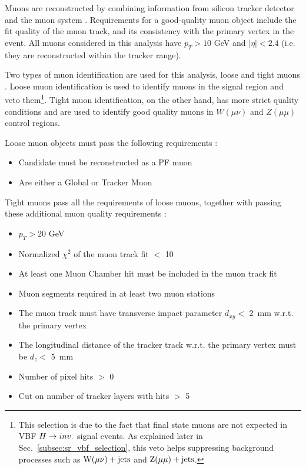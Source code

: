 Muons are reconstructed by combining information from silicon tracker detector and the muon system
\cite{cms:muon_paper}. Requirements for a good-quality muon object include the fit quality of the
muon track, and its consistency with the primary vertex in the event. All muons considered in this
analysis have $p_T > 10$ GeV and $|\eta| < 2.4$ (i.e. they are reconstructed within the tracker range).

Two types of muon identification are used for this analysis, loose and tight muons \cite{CMS-MUO-TWIKI-IDLOOSE,CMS-MUO-TWIKI-IDTIGHT}.
Loose muon identification is used to identify muons in the signal region and veto them\footnote{This selection is due to the fact that
final state muons are not expected in VBF $H \rightarrow inv.$ signal events. As explained later in Sec.~\ref{subsec:sr_vbf_selection}, this veto
helps suppressing background processes such as $\mathrm{W}(\mu\nu)+\textrm{jets}$ and $\mathrm{Z}(\mu\mu)+\textrm{jets}$.}. 
Tight muon identification, on the other hand,
has more strict quality conditions and are used to identify good quality muons in $W(\mu \nu)$ and $Z(\mu \mu)$ control regions.

Loose muon objects must pass the following requirements \cite{CMS-MUO-TWIKI-IDLOOSE}:

\begin{itemize}
    \item Candidate must be reconstructed as a PF muon
    \item Are either a Global or Tracker Muon
\end{itemize}

Tight muons pass all the requirements of loose muons, together with passing these additional muon quality requirements \cite{CMS-MUO-TWIKI-IDTIGHT}:

\begin{itemize}
    \item $p_T > 20$ GeV
    \item Normalized $\chi^2$ of the muon track fit $<$ 10
    \item At least one Muon Chamber hit must be included in the muon track fit
    \item Muon segments required in at least two muon stations
    \item The muon track must have transverse impact parameter $d_{xy} < $ 2~mm w.r.t. the primary vertex
    \item The longitudinal distance of the tracker track w.r.t. the primary vertex must be $d_z < $ 5~mm
    \item Number of pixel hits $>$ 0
    \item Cut on number of tracker layers with hits $>$ 5
\end{itemize}

